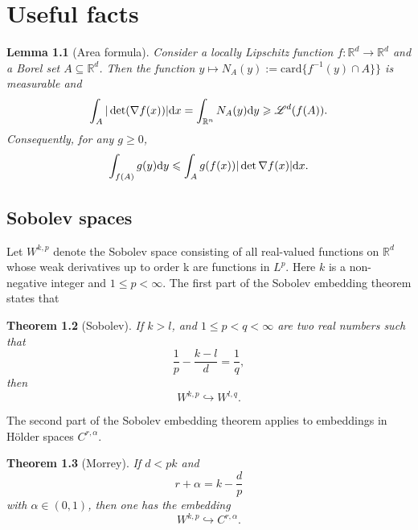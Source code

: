 \documentclass[twoside, 12pt]{book}
\numberwithin{equation}{chapter}
\def\theequation{\arabic{chapter}.\arabic{equation}}
\newtheorem{theorem}{Theorem}[section]
\newtheorem{lemma}[theorem]{Lemma}
\def\mR{{\mathbb R}}
\def\sL{{\mathscr L}}
\def\geq{\geqslant}
\def\leq{\leqslant}
\def\d{\text{\rm{d}}}
\begin{document}

	\appendix
	\chapter{Useful facts}
	    \setcounter{equation}{0}
	    \renewcommand\theequation{A.\arabic{equation}}
	    \begin{lemma}[Area formula]
	    	Consider a locally Lipschitz function $f: \mR^d \to \mR^d$ and a Borel set $A\subseteq \mR^d$. Then the function $y\mapsto N_A(y):= \mathrm{card}\{f^{-1}(y)\cap A\}\}$ is measurable and 
	    	\begin{equation*}
	    		\int_{A} |\det (\nabla f(x))| \d x = \int_{\mR^n} N_A(y) \d y \geq \sL^d(f(A)). 
	    	\end{equation*}
	    	Consequently, for any $g\geq 0$, 
	    	\begin{equation}\label{eq:area}
	    		\int_{f(A)}g(y)\d y\leq \int_{A} g(f(x)) |\det \nabla f(x)|\d x. 
	    	\end{equation}
	    \end{lemma}
	
	\section{Sobolev spaces}
    Let $W^{k,p}$ denote the Sobolev space consisting of all real-valued functions on $\mR^d$ whose weak derivatives up to order k are functions in $L^p$. Here $k$ is a non-negative integer and $1\leq p<\infty$. The first part of the Sobolev embedding theorem states that 
	\begin{theorem}[Sobolev]\label{thm:Sobolev}
		If $k>l$, and $1\leq p<q<\infty$ are two real numbers such that 
        \[
            \frac{1}{p}-\frac{k-l}{d}=\frac{1}{q}, 
        \]
        then 
        \[
            W^{k,p}\hookrightarrow W^{l,q}. 
        \]
	\end{theorem}
    The second part of the Sobolev embedding theorem applies to embeddings in Hölder spaces $C^{r,\alpha}$. 
    \begin{theorem}[Morrey]\label{thm:Morrey}
        If $d< pk$ and
    \[
        r+\alpha =k-\frac {d}{p}
    \]
    with $\alpha\in (0, 1)$, then one has the embedding 
    \[
        W^{k,p}\hookrightarrow C^{r,\alpha }.
    \]
	
    \end{theorem}
    
\end{document}
